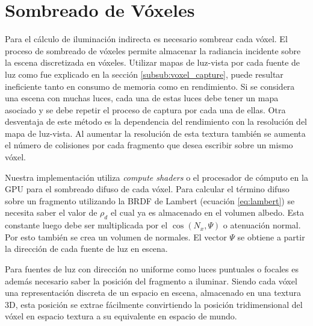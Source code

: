 \section{Sombreado de Vóxeles} %
\label{sec:sombreado_de_voxeles}
Para el cálculo de iluminación indirecta es necesario sombrear cada vóxel. El proceso de sombreado de vóxeles permite almacenar la radiancia incidente sobre la escena discretizada en vóxeles. Utilizar mapas de luz-vista por cada fuente de luz como fue explicado en la sección \ref{subsub:voxel_capture}, puede resultar ineficiente tanto en consumo de memoria como en rendimiento. Si se considera una escena con muchas luces, cada una de estas luces debe tener un mapa asociado y se debe repetir el proceso de captura por cada una de ellas. Otra desventaja de este método es la dependencia del rendimiento con la resolución del mapa de luz-vista. Al aumentar la resolución de esta textura también se aumenta el número de colisiones por cada fragmento que desea escribir sobre un mismo vóxel.

Nuestra implementación utiliza \emph{compute shaders} o el procesador de cómputo en la \ac{GPU} para el sombreado difuso de cada vóxel. Para calcular el término difuso sobre un fragmento utilizando la \ac{BRDF} de Lambert (ecuación \ref{eq:lambert}) se necesita saber el valor de $\rho_{d}$ el cual ya es almacenado en el volumen albedo. Esta constante luego debe ser multiplicada por el $\cos(N_{x}, \Psi)$ o atenuación normal. Por esto también se crea un volumen de normales. El vector $\Psi$ se obtiene a partir la dirección de cada fuente de luz en escena.

Para fuentes de luz con dirección no uniforme como luces puntuales o focales es además necesario saber la posición del fragmento a iluminar. Siendo cada vóxel una representación discreta de un espacio en escena, almacenado en una textura 3D, esta posición se extrae fácilmente convirtiendo la posición tridimensional del vóxel en espacio textura a su equivalente en espacio de mundo.

